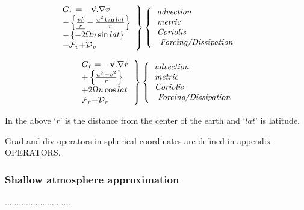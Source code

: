 \begin{equation}
\left. 
\begin{tabular}{l}
$G_{v}=-\vec{\mathbf{v}}.\nabla v$ \\ 
$-\left\{ \underline{\frac{v\dot{r}}{{r}}}-\frac{u^{2}\tan lat}{{r}%
}\right\} $ \\ 
$-\left\{ -2\Omega u\sin lat\right\} $ \\ 
$+\mathcal{F}_{v}\mathcal{+D}_{v}$%
\end{tabular}
\right\} \left\{ 
\begin{tabular}{l}
\textit{advection} \\ 
\textit{metric} \\ 
\textit{Coriolis} \\ 
\textit{\ Forcing/Dissipation}
\end{tabular}
\right. \qquad  \label{Gv}
\end{equation}
\qquad \qquad \qquad \qquad \qquad

\begin{equation}
\left. 
\begin{tabular}{l}
$G_{\dot{r}}=-\vec{\mathbf{v}}.\nabla \dot{r}$ \\ 
$+\left\{ \frac{u^{_{^{2}}}+v^{2}}{{{r}}}%
\right\} $ \\ 
${+2\Omega u\cos lat}$ \\ 
$\mathcal{F}_{\dot{r}}\mathcal{+D}_{\dot{r}}$%
\end{tabular}
\right\} \left\{ 
\begin{tabular}{l}
\textit{advection} \\ 
\textit{metric} \\ 
\textit{Coriolis} \\ 
\textit{\ Forcing/Dissipation}
\end{tabular}
\right.  \label{Gw}
\end{equation}
\qquad \qquad \qquad \qquad \qquad

In the above `${r}$' is the distance from the center of the earth and `$%
lat$' is latitude.

Grad and div operators in spherical coordinates are defined in appendix
OPERATORS.%

\subsubsection{Shallow atmosphere approximation}

............................

